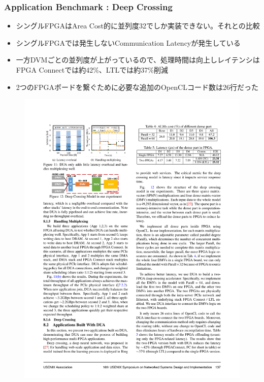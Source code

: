 \documentclass[dvipdfmx,9pt,notheorems]{beamer}
\theoremstyle{definition}
\begin{document}
\begin{frame}\frametitle{Application Benchmark : Deep Crossing}
	\begin{itemize}
			\item シングルFPGAはArea Cost的に並列度32でしか実装できない。それとの比較
			\item シングルFPGAでは発生しないCommunication Latencyが発生している
			\item 一方DVMごとの並列度が上がっているので、処理時間は向上しレイテンシはFPGA Connectでは約42\%、LTLでは約37\%削減
			\item 2つのFPGAボードを繋ぐために必要な追加のOpenCLコード数は26行だった
	\end{itemize}
  \begin{figure}[htb]
		\includegraphics[scale=1.0]{fig/table4.pdf}
  \end{figure}
  \begin{figure}[htb]

\end{figure}
\end{frame}
\end{document}
